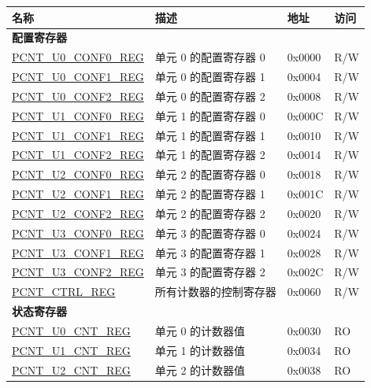 \begin{longtable}{ | p{6cm} | p{7.2cm} | p{1.3cm} | p{1cm} | }
\hline\rowcolor{lightgray}
名称 & 描述 &  地址 & 访问 \\ \hline
\endhead
\multicolumn{4}{|l|}{\textbf{配置寄存器}} \\ \hline
\hyperref[regdesc:PCNTUNCONF0REG]{PCNT\_U0\_CONF0\_REG} & 单元 0 的配置寄存器 0 & 0x0000 & R/W \\ \hline
\hyperref[regdesc:PCNTUNCONF1REG]{PCNT\_U0\_CONF1\_REG} & 单元 0 的配置寄存器 1 & 0x0004 & R/W \\ \hline
\hyperref[regdesc:PCNTUNCONF2REG]{PCNT\_U0\_CONF2\_REG} & 单元 0 的配置寄存器 2 & 0x0008 & R/W \\ \hline
\hyperref[regdesc:PCNTUNCONF0REG]{PCNT\_U1\_CONF0\_REG} & 单元 1 的配置寄存器 0 & 0x000C & R/W \\ \hline
\hyperref[regdesc:PCNTUNCONF1REG]{PCNT\_U1\_CONF1\_REG} & 单元 1 的配置寄存器 1 & 0x0010 & R/W \\ \hline
\hyperref[regdesc:PCNTUNCONF2REG]{PCNT\_U1\_CONF2\_REG} & 单元 1 的配置寄存器 2 & 0x0014 & R/W \\ \hline
\hyperref[regdesc:PCNTUNCONF0REG]{PCNT\_U2\_CONF0\_REG} & 单元 2 的配置寄存器 0 & 0x0018 & R/W \\ \hline
\hyperref[regdesc:PCNTUNCONF1REG]{PCNT\_U2\_CONF1\_REG} & 单元 2 的配置寄存器 1 & 0x001C & R/W \\ \hline
\hyperref[regdesc:PCNTUNCONF2REG]{PCNT\_U2\_CONF2\_REG} & 单元 2 的配置寄存器 2 & 0x0020 & R/W \\ \hline
\hyperref[regdesc:PCNTUNCONF0REG]{PCNT\_U3\_CONF0\_REG} & 单元 3 的配置寄存器 0 & 0x0024 & R/W \\ \hline
\hyperref[regdesc:PCNTUNCONF1REG]{PCNT\_U3\_CONF1\_REG} & 单元 3 的配置寄存器 1 & 0x0028 & R/W \\ \hline
\hyperref[regdesc:PCNTUNCONF2REG]{PCNT\_U3\_CONF2\_REG} & 单元 3 的配置寄存器 2 & 0x002C & R/W \\ \hline
\hyperref[regdesc:PCNTCTRLREG]{PCNT\_CTRL\_REG} & 所有计数器的控制寄存器 & 0x0060 & R/W \\ \hline
\multicolumn{4}{|l|}{\textbf{状态寄存器}} \\ \hline
\hyperref[regdesc:PCNTUNCNTREG]{PCNT\_U0\_CNT\_REG} & 单元 0 的计数器值 & 0x0030 & RO \\ \hline
\hyperref[regdesc:PCNTUNCNTREG]{PCNT\_U1\_CNT\_REG} & 单元 1 的计数器值 & 0x0034 & RO \\ \hline
\hyperref[regdesc:PCNTUNCNTREG]{PCNT\_U2\_CNT\_REG} & 单元 2 的计数器值 & 0x0038 & RO \\ \hline

\end{longtable}
